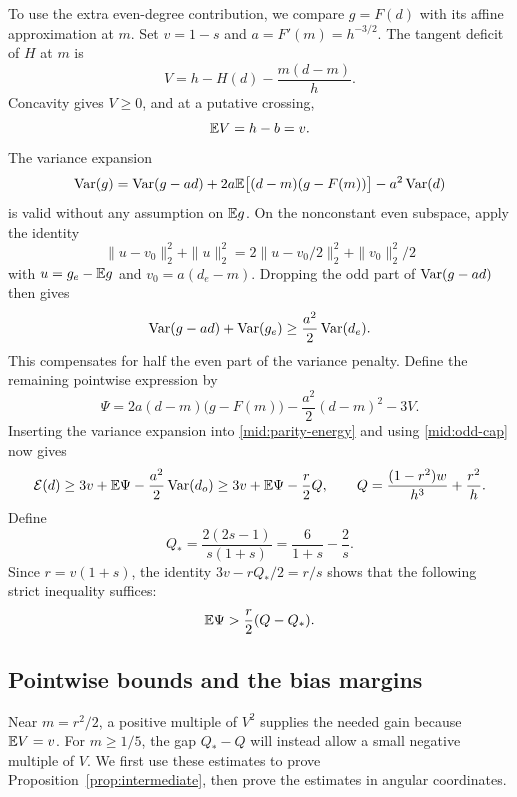 To use the extra even-degree contribution, we compare \(g=F(d)\)
with its affine approximation at \(m\). Set \(v=1-s\) and
\(a=F'(m)=h^{-3/2}\). The tangent deficit of \(H\) at \(m\) is
\begin{equation}\label{mid:V}
 V=h-H(d)-\frac{m(d-m)}h.
\end{equation}
Concavity gives \(V\ge0\), and at a putative crossing,
\begin{equation}\label{mid:EV}
 \mathbb E V=h-b=v.
\end{equation}
The variance expansion
\[
 \operatorname{Var}(g)=\operatorname{Var}(g-ad)
       +2a\mathbb E\bigl[(d-m)(g-F(m))\bigr]-a^2\operatorname{Var}(d)
\]
is valid without any assumption on \(\mathbb E g\). On the nonconstant even
subspace, apply the identity
\[
 \|u-v_0\|_2^2+\|u\|_2^2
 =2\|u-v_0/2\|_2^2+\|v_0\|_2^2/2
\]
with \(u=g_e-\mathbb E g\) and \(v_0=a(d_e-m)\). Dropping the odd part
of \(\operatorname{Var}(g-ad)\) then gives
\[
 \operatorname{Var}(g-ad)+\operatorname{Var}(g_e)\ge\frac{a^2}{2}\operatorname{Var}(d_e).
\]
This compensates for half the even part of the variance penalty.
Define the remaining pointwise expression by
\begin{equation}\label{mid:Psi}
 \Psi=2a(d-m)\bigl(g-F(m)\bigr)
       -\frac{a^2}{2}(d-m)^2-3V.
\end{equation}
Inserting the variance expansion into \eqref{mid:parity-energy} and
using \eqref{mid:odd-cap} now gives
\begin{equation}\label{mid:energy-reduction}
 \mathcal E(d)\ge3v+\mathbb E\Psi-\frac{a^2}{2}\operatorname{Var}(d_o)
 \ge3v+\mathbb E\Psi-\frac r2 Q,
 \qquad Q=\frac{(1-r^2)w}{h^3}+\frac{r^2}{h}.
\end{equation}
Define
\begin{equation}\label{mid:Qstar}
 Q_* =\frac{2(2s-1)}{s(1+s)}
      =\frac6{1+s}-\frac2s.
\end{equation}
Since \(r=v(1+s)\), the identity
\(3v-rQ_*/2=r/s\) shows that the following strict inequality suffices:
\begin{equation}\label{mid:target}
 \mathbb E\Psi>\frac r2(Q-Q_*).
\end{equation}

\subsection{Pointwise bounds and the bias margins}

Near \(m=r^2/2\), a positive multiple of \(V^2\) supplies the needed
gain because \(\mathbb E V=v\). For \(m\ge1/5\), the gap
\(Q_*-Q\) will instead allow a small negative multiple of \(V\).
We first use these estimates to prove Proposition~\ref{prop:intermediate},
then prove the estimates in angular coordinates.


